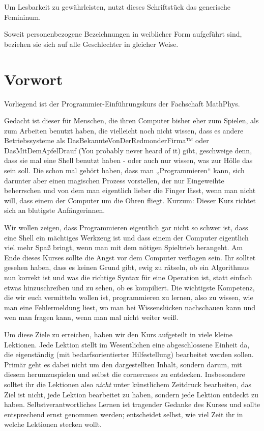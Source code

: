 \documentclass{vorkurs}
\begin{document}
Um Lesbarkeit zu gewährleisten, nutzt dieses Schriftstück das generische
Femininum.

Soweit personenbezogene Bezeichnungen in weiblicher Form aufgeführt sind,
beziehen sie sich auf alle Geschlechter in gleicher Weise.

\clearpage

\chapter*{Vorwort}
\pagestyle{empty}

Vorliegend ist der Programmier-Einführungskurs der Fachschaft MathPhys.

Gedacht ist dieser für Menschen, die ihren Computer bisher eher zum Spielen,
als zum Arbeiten benutzt haben, die vielleicht noch nicht wissen, dass es
andere Betriebssysteme als DasBekannteVonDerRedmonderFirma™ oder
DasMitDemApfelDrauf (You probably never heard of it) gibt, geschweige denn,
dass sie mal eine Shell benutzt haben - oder auch nur wissen, was zur Hölle das
sein soll.  Die schon mal gehört haben, dass man „Programmieren“ kann, sich
darunter aber einen magischen Prozess vorstellen, der nur Eingeweihte
beherrschen und von dem man eigentlich lieber die Finger lässt, wenn man nicht
will, dass einem der Computer um die Ohren fliegt.  Kurzum: Dieser Kurs richtet
sich an blutigste Anfängerinnen.

Wir wollen zeigen, dass Programmieren eigentlich gar nicht so schwer ist, dass
eine Shell ein mächtiges Werkzeug ist und dass einem der Computer eigentlich
viel mehr Spaß bringt, wenn man mit dem nötigen Spieltrieb herangeht.  Am Ende
dieses Kurses sollte die Angst vor dem Computer verflogen sein. Ihr solltet
gesehen haben, dass es keinen Grund gibt, ewig zu rätseln, ob ein Algorithmus
nun korrekt ist und was die richtige Syntax für eine Operation ist, statt
einfach etwas hinzuschreiben und zu sehen, ob es kompiliert.  Die wichtigste
Kompetenz, die wir euch vermitteln wollen ist, programmieren zu lernen, also zu
wissen, wie man eine Fehlermeldung liest, wo man bei Wissenslücken nachschauen
kann und wen man fragen kann, wenn man mal nicht weiter weiß.

Um diese Ziele zu erreichen, haben wir den Kurs aufgeteilt in viele kleine
Lektionen. Jede Lektion stellt im Wesentlichen eine abgeschlossene Einheit da,
die eigenständig (mit bedarfsorientierter Hilfestellung) bearbeitet werden
sollen. Primär geht es dabei nicht um den dargestellten Inhalt, sondern darum,
mit diesem herumzuspielen und selbst die cornercases zu entdecken.
Insbesondere solltet ihr die Lektionen also \emph{nicht} unter künstlichem
Zeitdruck bearbeiten, das Ziel ist nicht, jede Lektion bearbeitet zu haben,
sondern jede Lektion entdeckt zu haben.  Selbstverantwortliches Lernen ist
tragender Gedanke des Kurses und sollte entsprechend ernst genommen werden;
entscheidet selbst, wie viel Zeit ihr in welche Lektionen stecken wollt.
\end{document}
